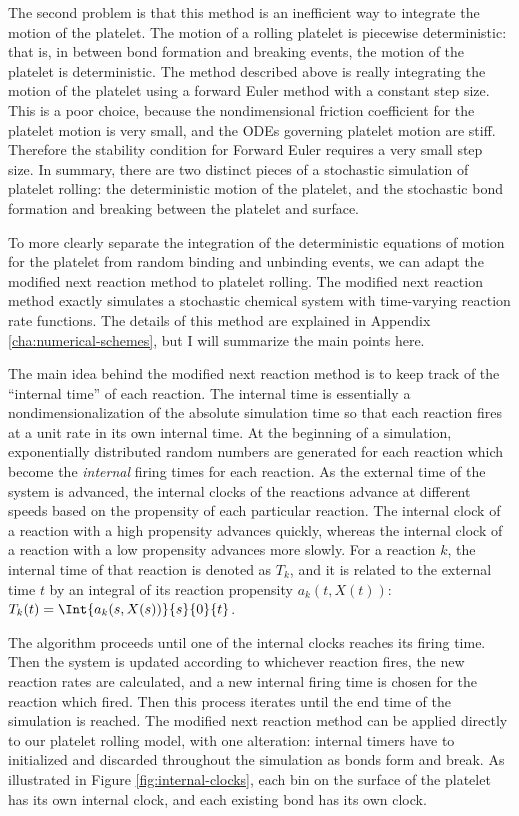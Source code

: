 The second problem is that this method is an inefficient way to
integrate the motion of the platelet. The motion of a rolling platelet
is piecewise deterministic: that is, in between bond formation and
breaking events, the motion of the platelet is deterministic. The
method described above is really integrating the motion of the
platelet using a forward Euler method with a constant step size. This
is a poor choice, because the nondimensional friction coefficient for
the platelet motion is very small, and the ODEs governing platelet
motion are stiff. Therefore the stability condition for Forward Euler
requires a very small step size. In summary, there are two distinct
pieces of a stochastic simulation of platelet rolling: the
deterministic motion of the platelet, and the stochastic bond
formation and breaking between the platelet and surface.

To more clearly separate the integration of the deterministic
equations of motion for the platelet from random binding and unbinding
events, we can adapt the modified next reaction method
\cite{Anderson2007} to platelet rolling. The modified next reaction
method exactly simulates a stochastic chemical system with
time-varying reaction rate functions. The details of this method are
explained in Appendix \ref{cha:numerical-schemes}, but I will
summarize the main points here.

The main idea behind the modified next reaction method is to keep
track of the ``internal time'' of each reaction. The internal time is
essentially a nondimensionalization of the absolute simulation time so
that each reaction fires at a unit rate in its own internal time. At
the beginning of a simulation, exponentially distributed random
numbers are generated for each reaction which become the
\emph{internal} firing times for each reaction. As the external time
of the system is advanced, the internal clocks of the reactions
advance at different speeds based on the propensity of each particular
reaction. The internal clock of a reaction with a high propensity
advances quickly, whereas the internal clock of a reaction with a low
propensity advances more slowly. For a reaction $k$, the internal time
of that reaction is denoted as $T_k$, and it is related to the
external time $t$ by an integral of its reaction propensity
$a_k(t, X(t))$: $T_k(t) = \Int{a_k(s, X(s))}{s}{0}{t}$.

The algorithm proceeds until one of the internal clocks reaches its
firing time. Then the system is updated according to whichever
reaction fires, the new reaction rates are calculated, and a new
internal firing time is chosen for the reaction which fired. Then this
process iterates until the end time of the simulation is reached. The
modified next reaction method can be applied directly to our platelet
rolling model, with one alteration: internal timers have to
initialized and discarded throughout the simulation as bonds form and
break. As illustrated in Figure \ref{fig:internal-clocks}, each bin on
the surface of the platelet has its own internal clock, and each
existing bond has its own clock.

